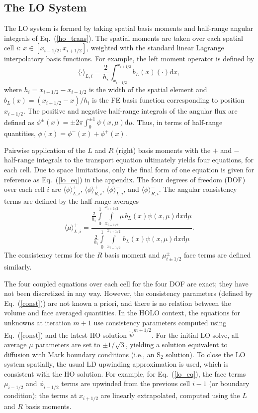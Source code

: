 \documentclass[10pt,twocolumn,pdftex,superscriptaddress]{anstrans}
\renewcommand{\eqref}[1]{(\ref{#1})}
\renewcommand{\d}{\mathrm{d}}
\newcommand{\mom}[1]{\langle #1 \rangle}
\newcommand{\xl}{{x_{i-1/2}}}
\newcommand{\xr}{{x_{i+1/2}}}
\begin{document}
\subsection*{The LO System}
\label{sec:lo}

The LO system is formed by taking spatial basis moments and half-range angular
integrals 
of Eq.~\eqref{ho_trans}.  The spatial moments are taken over each spatial cell $i$:
$x\in[x_{i-1/2},x_{i+1/2}]$, weighted with the standard linear Lagrange
interpolatory basis functions.  For example, the left moment operator is defined by
\begin{equation}\label{x_mom}
\mom{\cdot}_{L,i} = \frac{2}{h_i} \int_{x_{i-1/2}}^{\xr} b_L(x) (\cdot) \d x,
\end{equation}
where $h_i=x_{i+1/2}-x_{i-1/2}$ is the width of the spatial element and
$b_L(x)=(x_{i+1/2}-x)/h_i$ is the FE basis function corresponding to position
$x_{i-1/2}$. The positive and negative half-range integrals of the angular flux are defined as
$ \phi^\pm(x) = \pm2\pi \int_0^{\pm 1} \psi(x,\mu) \d \mu$.
Thus, in terms of half-range quantities, $\phi(x) = \phi^-(x) + \phi ^+(x)$.  

Pairwise application of the $L$ and $R$ (right) basis
moments with the $+$ and $-$ half-range integrals to the transport equation
ultimately yields four
equations, for each cell.  Due to space limitations, only the final form of one
equation is given for reference as Eq.~\eqref{lo_eq} in the appendix.  The four
degrees of freedom (DOF) over each cell $i$ are $\mom{\phi}_{L,i}^+$,
$\mom{\phi}_{R,i}^+$, $\mom{\phi}_{L,i}^-$, and $\mom{\phi}_{R,i}^-$.  
The angular consistency terms are defined by the half-range averages
\begin{equation}\label{const}
\mom{{\mu}}_{L,i}^+ =  \frac{
{\displaystyle \frac{2}{h_i}} \int\limits_0^1 \int\limits_\xl^\xr \mu \, b_L(x)
\psi(x,\mu) \d x \d \mu } 
{{\displaystyle \frac{2}{h_i}} \int\limits_0^1 \int\limits_\xl^\xr \, b_L(x)
\psi(x,\mu) \d x \d \mu } .
\end{equation}
The consistency terms for the $R$ basis moment and $\mu_{i\pm1/2}^\pm$ face
terms are defined similarly.


The four coupled equations over each cell for the four DOF are exact; they have not been discretized
in any way.  However, the consistency parameters (defined by Eq.~\eqref{const}) are not known a priori, and
there is no relation between the volume and face averaged quantities.  In the HOLO
context, the equations for unknowns at iteration $m+1$ use consistency parameters
computed using Eq.~\eqref{const} and the latest HO solution $\tilde{\psi}^{m+1/2}$. For the initial LO
solve, all average $\mu$ parameters are
set to $\pm 1/\sqrt{3}$, yielding a solution equivalent to diffusion
with Mark boundary conditions (i.e., an S$_2$ solution).  To close the LO system spatially, the usual LD upwinding
approximation is used, which is consistent with the HO solution.  For example, for Eq.~\eqref{lo_eq}, the face terms $\mu_{i-1/2}$ and $\phi_{i-1/2}$
terms are upwinded from the previous cell $i-1$ (or boundary condition); the terms
at $x_{i+1/2}$ are linearly extrapolated, computed using the $L$ and $R$ basis moments.
  
\end{document}
